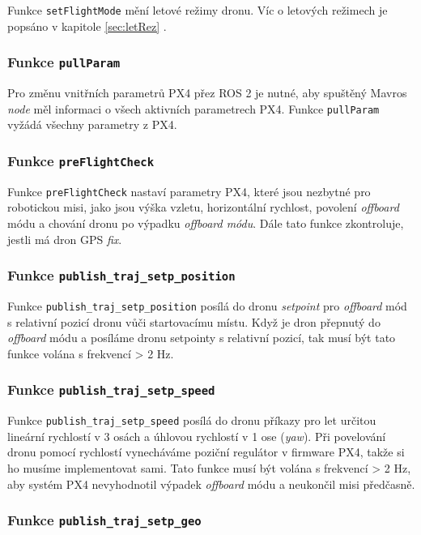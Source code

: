 Funkce \texttt{setFlightMode} mění letové režimy dronu. Víc o letových režimech je popsáno v kapitole \ref{sec:letRez} .

\subsubsection{Funkce \texttt{pullParam}}

Pro změnu vnitřních parametrů PX4 přez ROS 2 je nutné, aby spuštěný Mavros \textit{node} měl informaci o všech aktivních parametrech PX4. Funkce \texttt{pullParam} vyžádá všechny parametry z PX4.

\subsubsection{Funkce \texttt{preFlightCheck}}

Funkce \texttt{preFlightCheck} nastaví parametry PX4, které jsou nezbytné pro robotickou misi, jako jsou výška vzletu, horizontální rychlost, povolení \textit{offboard} módu a chování dronu po výpadku \textit{offboard módu}. Dále tato funkce zkontroluje, jestli má dron GPS \textit{fix}.

\subsubsection{Funkce \texttt{publish\_traj\_setp\_position}}

Funkce \texttt{publish\_traj\_setp\_position} posílá do dronu \textit{setpoint} pro \textit{offboard} mód s relativní pozicí dronu vůči startovacímu místu. Když je dron přepnutý do \textit{offboard} módu a posíláme dronu setpointy s relativní pozicí, tak musí být tato funkce volána s frekvencí > 2 Hz.

\subsubsection{Funkce \texttt{publish\_traj\_setp\_speed}}

Funkce \texttt{publish\_traj\_setp\_speed} posílá do dronu příkazy pro let určitou lineární rychlostí v 3 osách a úhlovou rychlostí v 1 ose (\textit{yaw}). Při povelování dronu pomocí rychlostí vynecháváme poziční regulátor v firmware PX4, takže si ho musíme implementovat sami. Tato funkce musí být volána s frekvencí > 2 Hz, aby systém PX4 nevyhodnotil výpadek \textit{offboard} módu a neukončil misi předčasně.

\subsubsection{Funkce \texttt{publish\_traj\_setp\_geo}}

